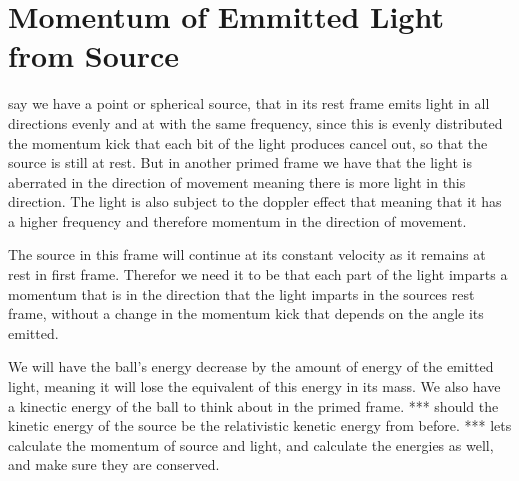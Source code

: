 \section{Momentum of Emmitted Light from Source}\label{sect: Momentum of Emmitted Light from Source}

say we have a point or spherical source, that in its rest frame emits light in all directions evenly and at with the same frequency, since this is evenly distributed the momentum kick that each bit of the light produces cancel out, so that the source is still at rest.
But in another primed frame we have that the light is aberrated in the direction of movement meaning there is more light in this direction.
The light is also subject to the doppler effect that meaning that it has a higher frequency and therefore momentum in the direction of movement.

The source in this frame will continue at its constant velocity as it remains at rest in first frame.
Therefor we need it to be that each part of the light imparts a momentum that is in the direction that the light imparts in the sources rest frame, without a change in the momentum kick that depends on the angle its emitted.

We will have the ball's energy decrease by the amount of energy of the emitted light, meaning it will lose the equivalent of this energy in its mass.
We also have a kinectic energy of the ball to think about in the primed frame.
*** should the kinetic energy of the source be the relativistic kenetic energy from before.
*** lets calculate the momentum of source and light, and calculate the energies as well, and make sure they are conserved.


